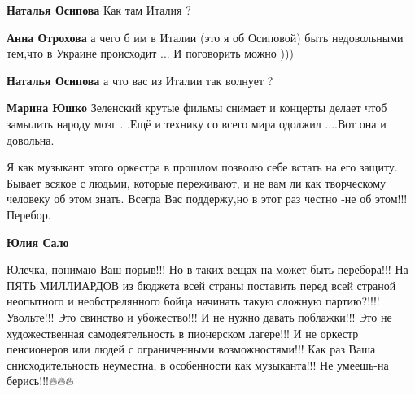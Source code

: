 \begin{itemize}
\begin{itemize}
\textbf{Наталья Осипова} Как там Италия ?

 
\textbf{Анна Отрохова} а чего б им в Италии (это я об Осиповой) быть недовольными тем,что в Украине происходит ... И поговорить можно )))

 
\textbf{Наталья Осипова} а что вас из Италии так волнует ?

 
\textbf{Марина Юшко} Зеленский крутые фильмы снимает и концерты делает чтоб замылить народу мозг . .Ещё и технику со всего мира одолжил ....Вот она и довольна.
\end{itemize}

 

Я как музыкант этого оркестра в прошлом позволю себе встать на его защиту.
Бывает всякое с людьми, которые переживают, и не вам ли как творческому
человеку об этом знать. Всегда Вас поддержу,но в этот раз честно -не об этом!!!
Перебор.

\begin{itemize}
 
\textbf{Юлия Сало} 

\obeycr
Юлечка, понимаю Ваш порыв!!!
Но в таких вещах на может быть перебора!!!
На ПЯТЬ МИЛЛИАРДОВ из бюджета всей страны поставить перед всей страной неопытного и необстрелянного бойца начинать такую сложную партию?!!!!
Увольте!!!
Это свинство и убожество!!!
И не нужно давать поблажки!!!
Это не художественная самодеятельность в пионерском лагере!!!
И не оркестр пенсионеров или людей с ограниченными возможностями!!!
Как раз Ваша снисходительность неуместна, в особенности как музыканта!!!
Не умеешь-на берись!!!🔥🔥🔥
\restorecr



\end{itemize}
\end{itemize}
